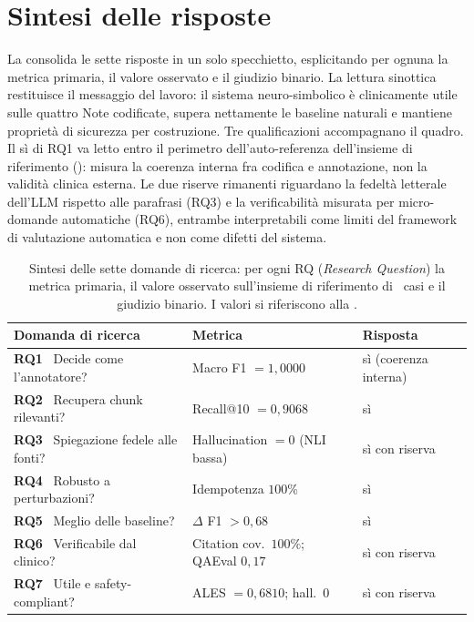 \section{Sintesi delle risposte}
\label{sec:sintesi-rq}

La  consolida le sette risposte in un solo specchietto, esplicitando per ognuna la metrica primaria, il valore osservato e il giudizio binario. La lettura sinottica restituisce il messaggio del lavoro: il sistema neuro-simbolico è clinicamente utile sulle quattro Note codificate, supera nettamente le baseline naturali e mantiene proprietà di sicurezza per costruzione. Tre qualificazioni accompagnano il quadro. Il sì di RQ1 va letto entro il perimetro dell'auto-referenza dell'insieme di riferimento (): misura la coerenza interna fra codifica e annotazione, non la validità clinica esterna. Le due riserve rimanenti riguardano la fedeltà letterale dell'LLM rispetto alle parafrasi (RQ3) e la verificabilità misurata per micro-domande automatiche (RQ6), entrambe interpretabili come limiti del framework di valutazione automatica e non come difetti del sistema.

\begin{table}[t]
  \centering
  \caption{Sintesi delle sette domande di ricerca: per ogni RQ (\emph{Research Question}) la metrica primaria, il valore osservato sull'insieme di riferimento di \goldn\ casi e il giudizio binario. I valori si riferiscono alla \cleanroomrun.}
  \label{tab:rq-summary}
  \small
  \begin{tabular}{@{}p{}p{}l@{}}
    \toprule
    Domanda di ricerca & Metrica & Risposta \\
    \midrule
    \textbf{RQ1}~ Decide come l'annotatore? & Macro F1 $=1{,}0000$ & sì (coerenza interna) \\
    \textbf{RQ2}~ Recupera chunk rilevanti? & Recall@10 $=0{,}9068$ & sì \\
    \textbf{RQ3}~ Spiegazione fedele alle fonti? & Hallucination $=0$ (NLI bassa) & sì con riserva \\
    \textbf{RQ4}~ Robusto a perturbazioni? & Idempotenza $100\%$ & sì \\
    \textbf{RQ5}~ Meglio delle baseline? & $\Delta$ F1 $> 0{,}68$ & sì \\
    \textbf{RQ6}~ Verificabile dal clinico? & Citation cov.\ $100\%$; QAEval $0{,}17$ & sì con riserva \\
    \textbf{RQ7}~ Utile e safety-compliant? & ALES $=0{,}6810$; hall.~$0$ & sì con riserva \\
    \bottomrule
  \end{tabular}
\end{table}

